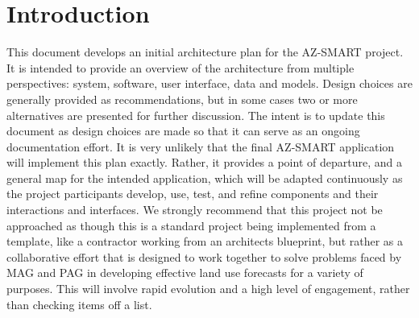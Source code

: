 \section{Introduction}
This document develops an initial architecture plan for the AZ-SMART project.  It is intended to 
provide an overview of the architecture
from multiple perspectives: system, software, user interface, data and models.  Design choices 
are generally provided as recommendations,
but in some cases two or more alternatives are presented for further discussion.  The intent is 
to update this document as design choices
are made so that it can serve as an ongoing documentation effort.  It is very unlikely that the 
final AZ-SMART application will implement
this plan exactly.  Rather, it provides a point of departure, and a general map for the 
intended application, which will be adapted
continuously as the project participants develop, use, test, and refine components and 
their interactions and interfaces.  We strongly recommend that this project not be approached
as though this is a standard project being implemented from a template, like a contractor working
from an architects blueprint, but rather as a collaborative effort that is designed to work
together to solve problems faced by MAG and PAG in developing effective land use forecasts for
a variety of purposes.  This will involve rapid evolution and a high level of engagement, rather
than checking items off a list.
